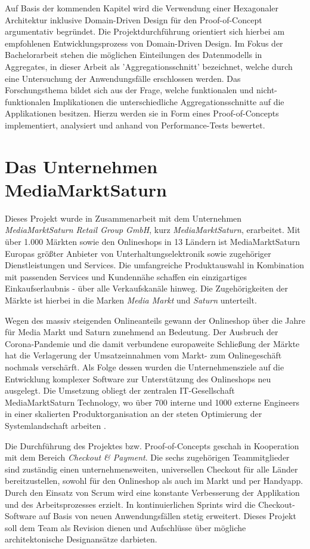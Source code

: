 Auf Basis der kommenden Kapitel wird die Verwendung einer Hexagonaler Architektur inklusive Domain-Driven Design für den Proof-of-Concept argumentativ begründet. Die Projektdurchführung orientiert sich hierbei am empfohlenen Entwicklungsprozess von Domain-Driven Design. Im Fokus der Bachelorarbeit stehen die möglichen Einteilungen des Datenmodells in Aggregates, in dieser Arbeit als 'Aggregationsschnitt' bezeichnet, welche  durch eine Untersuchung der Anwendungsfälle erschlossen werden. Das Forschungsthema bildet sich aus der Frage, welche funktionalen und nicht-funktionalen Implikationen die unterschiedliche Aggregationsschnitte auf die Applikationen besitzen. Hierzu werden sie in Form eines Proof-of-Concepts implementiert, analysiert und anhand von Performance-Tests bewertet.

\section{Das Unternehmen MediaMarktSaturn}

Dieses Projekt wurde in Zusammenarbeit mit dem Unternehmen \emph{MediaMarktSaturn Retail Group GmbH}, kurz \emph{MediaMarktSaturn}, erarbeitet. Mit über 1.000 Märkten sowie den Onlineshops in 13 Ländern ist MediaMarktSaturn Europas größter Anbieter von Unterhaltungselektronik sowie zugehöriger Dienstleistungen und Services. Die umfangreiche Produktauswahl in Kombination mit passenden Services und Kundennähe schaffen ein einzigartiges Einkaufserlaubnis - über alle Verkaufskanäle hinweg. Die Zugehörigkeiten der Märkte ist hierbei in die Marken \emph{Media Markt} und \emph{Saturn} unterteilt. \cite{mms.Unternehmen}

Wegen des massiv steigenden Onlineanteils gewann der Onlineshop über die Jahre für Media Markt und Saturn zunehmend an Bedeutung. Der Ausbruch der Corona-Pandemie und die damit verbundene europaweite Schließung der Märkte hat die Verlagerung der Umsatzeinnahmen vom Markt- zum Onlinegeschäft nochmals verschärft. Als Folge dessen wurden die Unternehmensziele auf die Entwicklung komplexer Software zur Unterstützung des Onlineshops neu ausgelegt. Die Umsetzung obliegt der zentralen IT-Gesellschaft MediaMarktSaturn Technology, wo über 700 interne und 1000 externe Engineers in einer skalierten Produktorganisation an der steten Optimierung der Systemlandschaft arbeiten \cite{mms.technology}.

Die Durchführung des Projektes bzw. Proof-of-Concepts geschah in Kooperation mit dem Bereich \emph{Checkout \& Payment}. Die sechs zugehörigen Teammitglieder sind zuständig einen unternehmensweiten, universellen Checkout für alle Länder bereitzustellen, sowohl für den Onlineshop als auch im Markt und per Handyapp. Durch den Einsatz von \Gls{Scrum} wird eine konstante Verbesserung der Applikation und des Arbeitsprozesses erzielt. In kontinuierlichen \Glspl{Sprint} wird die Checkout-Software auf Basis von neuen Anwendungsfällen stetig erweitert. Dieses Projekt soll dem Team als Revision dienen und Aufschlüsse über mögliche architektonische Designansätze darbieten.


